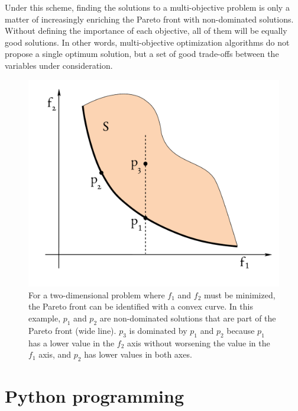Under this scheme, finding the solutions to a multi-objective problem is only a matter of increasingly enriching the Pareto front with non-dominated solutions. Without defining the importance of each objective, all of them will be equally good solutions. In other words, multi-objective optimization algorithms do not propose a single optimum solution, but a set of good trade-offs between the variables under consideration.\cite{coello2007evolutionary}


\begin{figure}[H]
	\includegraphics[width=\textwidth]{./figures/02/FrentePareto.pdf}
	\caption[A Pareto front for two dimensions]{For a two-dimensional problem where $f_{1}$ and $f_{2}$ must be minimized, the Pareto front can be identified with a convex curve. In this example, $p_{1}$ and $p_{2}$ are non-dominated solutions that are part of the Pareto front (wide line). $p_{3}$ is dominated by $p_{1}$ and $p_{2}$ because $p_{1}$ has a lower value in the $f_{2}$ axis without worsening the value in the $f_{1}$ axis, and $p_{2}$ has lower values in both axes.}
	\label{fig:pareto}
\end{figure}

\section{Python programming}


